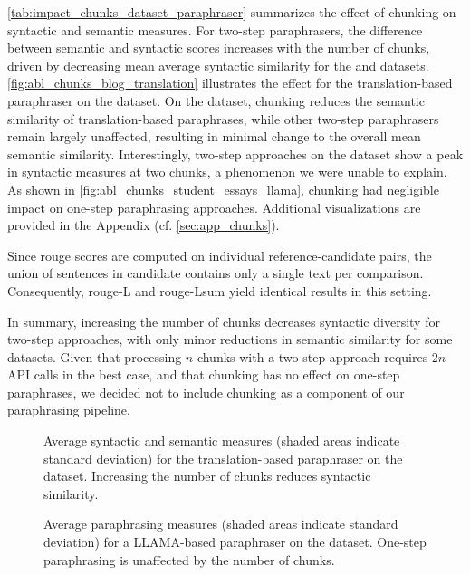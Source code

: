 \autoref{tab:impact_chunks_dataset_paraphraser} summarizes the effect of chunking on syntactic and semantic measures. 
For two-step paraphrasers, the difference between semantic and syntactic scores increases with the number of chunks, driven by decreasing mean average syntactic similarity for the \dataBlog{} and \dataStudent{} datasets. 
\autoref{fig:abl_chunks_blog_translation} illustrates the effect for the translation-based paraphraser on the \dataBlog{} dataset. 
On the \dataGutenberg{} dataset, chunking reduces the semantic similarity of translation-based paraphrases, while other two-step paraphrasers remain largely unaffected, resulting in minimal change to the overall mean semantic similarity. 
Interestingly, two-step approaches on the \dataPan{} dataset show a peak in syntactic measures at two chunks, a phenomenon we were unable to explain. 
As shown in \autoref{fig:abl_chunks_student_essays_llama}, chunking had negligible impact on one-step paraphrasing approaches. 
Additional visualizations are provided in the Appendix (cf. \autoref{sec:app_chunks}).

Since \ac{rouge} scores are computed on individual reference-candidate pairs, the union of sentences in candidate contains only a single text per comparison. 
Consequently, \ac{rouge}-L and \ac{rouge}-Lsum yield identical results in this setting.

In summary, increasing the number of chunks decreases syntactic diversity for two-step approaches, with only minor reductions in semantic similarity for some datasets. 
Given that processing $n$ chunks with a two-step approach requires $2n$ API calls in the best case, and that chunking has no effect on one-step paraphrases, we decided not to include chunking as a component of our paraphrasing pipeline.

\begin{figure}[htbp]
    \centering
    
    \caption[Impact of the number of chunks on \dataBlog{} dataset.]{
    Average syntactic and semantic measures (shaded areas indicate standard deviation) for the translation-based paraphraser on the \dataBlog{} dataset. 
    Increasing the number of chunks reduces syntactic similarity.    
    }
    \label{fig:abl_chunks_blog_translation}
\end{figure}

\begin{figure}[htbp]
    \centering
    
    \caption[Impact of the number of chunks on \dataStudent{} dataset.]{Average paraphrasing measures (shaded areas indicate standard deviation) for a LLAMA-based paraphraser on the \dataStudent{} dataset. 
    One-step paraphrasing is unaffected by the number of chunks.
    }
    \label{fig:abl_chunks_student_essays_llama}
\end{figure}